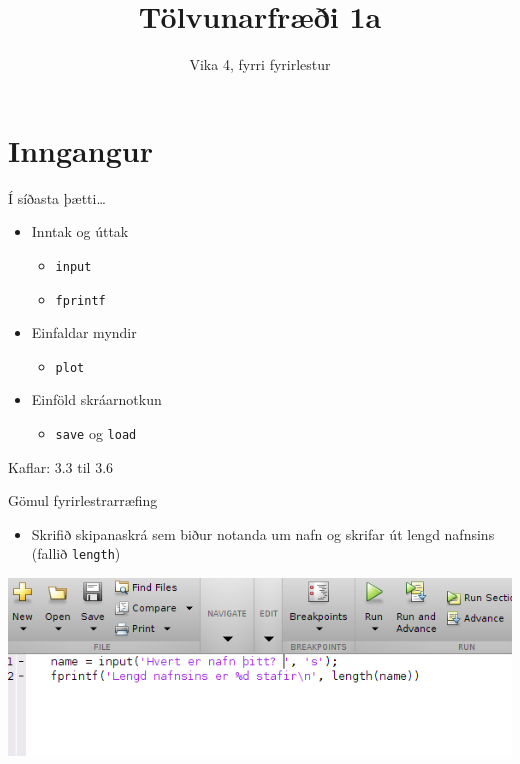 \documentclass{beamer}
\title{Tölvunarfræði 1a}
\subtitle{Vika 4, fyrri fyrirlestur}
\begin{document}
\begin{frame}
\titlepage
\end{frame}

\section{Inngangur}


\begin{frame}{Í síðasta þætti\ldots}
\begin{itemize}
 \item Inntak og úttak
 \begin{itemize}
  \item \texttt{input}
  \item \texttt{fprintf}
 \end{itemize}
 \item Einfaldar myndir
 \begin{itemize}
  \item \texttt{plot}
 \end{itemize}
 \item Einföld skráarnotkun
 \begin{itemize}
  \item \texttt{save} og \texttt{load}
 \end{itemize}
\end{itemize}
Kaflar: 3.3 til 3.6
\end{frame}

\begin{frame}{Gömul fyrirlestrarræfing}
\begin{itemize}
 \item Skrifið skipanaskrá sem biður notanda um nafn og skrifar út lengd nafnsins (fallið \texttt{length})
\end{itemize}
\includegraphics[width=\textwidth]{Pics/name-length}
\end{frame}
\end{document}
